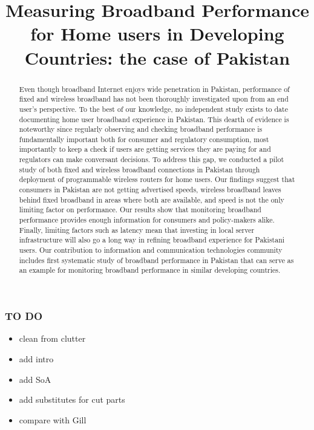 \documentclass{sig-alternate-10pt}
\begin{document}
\begin{notecommenti}
\subsubsection{TO DO}
\begin{itemize}
\item clean from clutter
\item add intro
\item add SoA
\item add substitutes for cut parts
\item compare with Gill
\end{itemize}
\end{notecommenti}


\title{Measuring Broadband Performance for Home users in Developing Countries: the case of Pakistan}


\maketitle
\begin{abstract}
Even though broadband Internet enjoys wide penetration in Pakistan, performance of fixed and wireless broadband has not been thoroughly investigated upon from an end user's perspective. To the best of our knowledge, no independent study exists to date documenting home user broadband experience in Pakistan. This dearth of evidence is noteworthy since regularly observing and checking broadband performance is fundamentally important both for consumer and regulatory consumption, most importantly to keep a check if users are getting services they are paying for and regulators can make conversant decisions. To address this gap, we conducted a pilot study of both fixed and wireless broadband connections in Pakistan through deployment of programmable wireless routers for home users.  Our findings suggest that consumers in Pakistan are not getting advertised speeds, wireless broadband leaves behind fixed broadband in areas where both are available, and speed is not the only limiting factor on performance. Our results show that monitoring broadband performance provides enough information for consumers and policy-makers alike. Finally, limiting factors such as latency mean that investing in local server infrastructure will also go a long way in refining broadband experience for Pakistani users. Our contribution to information and communication technologies community includes first systematic study of broadband performance in Pakistan that can serve as an example for monitoring broadband performance in similar developing countries.
\end{abstract}
\end{document}
